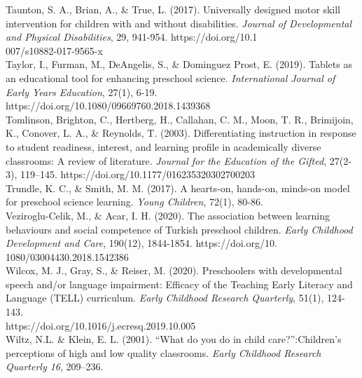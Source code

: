 \documentclass[11.5pt]{sig-alternate}
\begin{document}
Taunton, S. A., Brian, A., \& True, L. (2017). Universally designed motor skill intervention for 
children with and without disabilities. \textit{Journal of Developmental and Physical Disabilities}, 29, 941-954. https://doi.org/10.1\\007/s10882-017-9565-x 
\\

Taylor, I., Furman, M., DeAngelis, S., \& Dominguez Prost, E. (2019). Tablets as an educational 
tool for enhancing preschool science. \textit{International Journal of Early Years Education}, 27(1), 6-19. \\https://doi.org/10.1080/09669760.2018.1439368 
\\

Tomlinson, Brighton, C., Hertberg, H., Callahan, C. M., Moon, T. R., Brimijoin, K., Conover, L. 
A., \& Reynolds, T. (2003). Differentiating instruction in response to student readiness, interest, and learning profile in academically diverse classrooms: A review of literature. \textit{Journal for the Education of the Gifted}, 27(2-3), 119–145. https://doi.org/10.1177/016235320302700203
\\

Trundle, K. C., \& Smith, M. M. (2017). A hearts-on, hands-on, minds-on model for preschool 
science learning. \textit{Young Children}, 72(1), 80-86.
\\

Veziroglu-Celik, M., \& Acar, I. H. (2020). The association between learning behaviours and 
social competence of Turkish preschool children. \textit{Early Childhood Development and Care}, 190(12), 1844-1854. https://doi.org/10.\\1080/03004430.2018.1542386 
\\

Wilcox, M. J., Gray, S., \& Reiser, M. (2020). Preschoolers with developmental speech and/or 
language impairment: Efficacy of the Teaching Early Literacy and Language (TELL) curriculum. \textit{Early Childhood Research Quarterly}, 51(1), 124-143. \\https://doi.org/10.1016/j.ecresq.2019.10.005 
\\

Wiltz,  N.L. \& Klein,  E. L. (2001). “What do you do in child care?”:Children’s perceptions of 
high and low quality classrooms. \textit{Early Childhood Research Quarterly 16}, 209–236.
\end{document}
